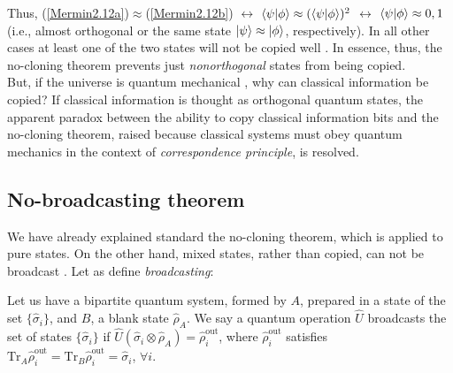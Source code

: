 \documentclass[11pt]{article}
\numberwithin{equation}{section} %
\numberwithin{figure}{section} %
\begin{document}
\begin{appendices}
Thus, (\ref{Mermin2.12a})$\approx$(\ref{Mermin2.12b}) $\leftrightarrow$ $\braket{\psi|\phi}\approx(\braket{\psi|\phi})^2$ $\leftrightarrow$ $\braket{\psi|\phi}\approx0,1$ (i.e., almost orthogonal or the same state $\ket{\psi}\approx\ket{\phi}$, respectively). In all other cases at least one of the two states will not be copied well \cite[p.~40]{Mermin}. In essence, thus, the no-cloning theorem prevents just \emph{nonorthogonal} states from being copied.\\

But, if the universe is quantum mechanical \cite[p.~468, l.~6]{Feynman} \cite[p.~3, l.~25]{Shor}, why can classical information be copied? If classical information is thought as orthogonal quantum states, the apparent paradox between the ability to copy classical information bits and the no-cloning theorem, raised because classical systems must obey quantum mechanics \cite[p.~29, l.~4-6 \& p.~30, l.~1-2 \& 8-9]{Nielsen} in the context of \emph{correspondence principle}, is resolved.\\



\subsection{No-broadcasting theorem} \label{No-broadcasting theorem}
We have already explained standard the no-cloning theorem, which is applied to pure states. On the other hand, mixed states, rather than copied, can not be broadcast  \cite[p.~1, l.~3]{No-broadcasting}. Let as define \emph{broadcasting}:

Let us have a bipartite quantum system, formed by $A$, prepared in a state of the set $\{\hat{\sigma}_i\}$, and $B$, a blank state $\hat{\rho}_A$. We say a quantum operation $\hat{U}$ broadcasts the set of states $\{\hat{\sigma}_i\}$ if $\hat{U}(\hat{\sigma}_i\otimes\hat{\rho}_A)=\hat{\rho}_i^{\textrm{out}}$, where $\hat{\rho}_i^{\textrm{out}}$ satisfies $\textrm{Tr}_{A}\hat{\rho}_i^{\textrm{out}}=\textrm{Tr}_{B}\hat{\rho}_i^{\textrm{out}}=\hat{\sigma}_i$, $\forall i$.


\end{appendices}
\end{document}
